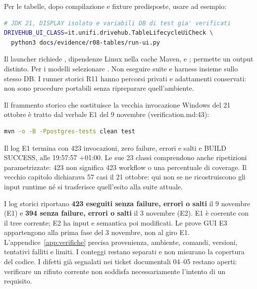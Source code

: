 Per le tabelle, dopo compilazione e fixture predisposte, usare ad esempio:
\begin{lstlisting}[language=bash,numbers=none,gobble=0,caption={Selezione documentata dell'harness tabelle, esterno a Surefire.},label=lst:test-comando-ui]
# JDK 21, DISPLAY isolato e variabili DB di test gia' verificati
DRIVEHUB_UI_CLASS=it.unifi.drivehub.TableLifecycleUiCheck \
  python3 docs/evidence/r08-tables/run-ui.py
\end{lstlisting}
Il launcher richiede , dipendenze Linux nella cache Maven,
\code{target/classes} e \code{target/test-classes};
 permette un output distinto.
Per i modelli selezionare .
Non eseguire suite e harness insieme sullo stesso DB. I runner storici
R11 hanno percorsi privati e adattamenti conservati: non sono procedure
portabili senza ripreparare quell'ambiente.

Il frammento storico che sostituisce la vecchia invocazione Windows del
21 ottobre è tratto dal verbale E1 del 9 novembre (verification.md:43):

\noindent\begin{minipage}{\linewidth}
\begin{lstlisting}[language=bash,firstnumber=43,gobble=0,caption={Comando storico E1, eseguito allora con cache e PostgreSQL dedicato.},label=lst:test-comando-storico]
mvn -o -B -Ppostgres-tests clean test
\end{lstlisting}
\end{minipage}


Il log E1  termina con 423 invocazioni, zero failure,
errori e salti e BUILD SUCCESS, alle 19:57:57 +01:00. Le sue 23 classi
comprendono anche ripetizioni parametrizzate: 423 non significa 423
workflow o una percentuale di coverage. Il vecchio capitolo dichiarava
57 casi il 21 ottobre: qui non se ne ricostruiscono gli input runtime
né si trasferisce quell'esito alla suite attuale.

I log storici riportano \textbf{423 eseguiti senza failure, errori o salti}
il 9 novembre (E1) e \textbf{394 senza failure, errori o salti} il
3 novembre (E2). E1 è coerente con il tree corrente; E2 ha input e
semantica poi modificati. Le prove GUI E3 appartengono alla prima fase
del 3 novembre, non al giro E1. L'appendice~\ref{app:verifiche} precisa
provenienza, ambiente, comandi, versioni, tentativi falliti e limiti.
I conteggi restano separati e non misurano la copertura del codice.
I difetti già segnalati nei ticket documentali 04--05 restano aperti:
verificare un rifiuto corrente non soddisfa necessariamente l'intento
di un requisito.
\endgroup
